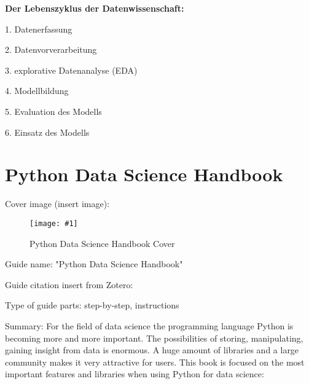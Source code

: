 \documentclass{article}
\newlength{\imgwidth}
\newcommand\scaledgraphics[2]{%
                
\settowidth{\imgwidth}{\texttt{[image: \#1]}}%
                
\setlength{\imgwidth}{\minof{\imgwidth}{#2\textwidth}}%
                
\texttt{[image: \#1]}%
                
}
\begin{document}
\textbf{Der Lebenszyklus der Datenwissenschaft:}


1. Datenerfassung 


2. Datenvorverarbeitung 


3. explorative Datenanalyse (EDA) 


4. Modellbildung


5. Evaluation des Modells 


6. Einsatz des Modells 





\section{Python Data Science Handbook}\label{H8115129}



Cover image (insert image):


\begin{center}
\begin{figure}
\scaledgraphics{43052757-2454-42ab-a98c-c7977cb4e249.png}{0.5}
\caption*{Python Data Science Handbook Cover}\label{F16921711}
\end{figure}


\end{center}


Guide name: "Python Data Science Handbook"


Guide citation insert from Zotero: \autocite{vanderplas_python_2016}


Type of guide parts: step-by-step, instructions


Summary: For the field of data science the programming language Python is becoming more and more important. The possibilities of storing, manipulating, gaining insight from data is enormous. A huge amount of libraries and a large community makes it very attractive for users. This book is focused on the most important features and libraries when using Python for data science: 
\end{document}
